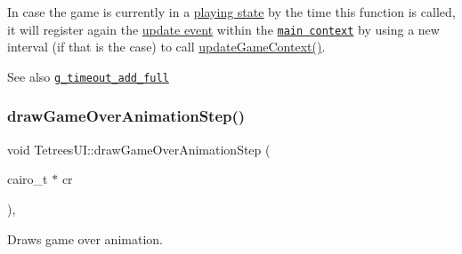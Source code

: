 In case the game is currently in a \hyperlink{TetreesDefs_8hpp_aebae08b2e3a36f1452b33acaf1eaab40ab8ee64fcce8c3b17312b20c78fc9695a}{playing state} by the time this function is called, it will register again the \hyperlink{TetreesDefs_8hpp_aaf9e35ddd627efe32323b1ba02ee514e}{update event} within the \href{https://developer.gnome.org/programming-guidelines/stable/main-contexts.html.en}{\tt main context} by using a new interval (if that is the case) to call \hyperlink{classTetreesUI_a0fe8ccb5c1c594792591036f4f02175f}{update\+Game\+Context()}. \begin{DoxySeeAlso}{See also}
\href{https://developer.gnome.org/glib/stable/glib-The-Main-Event-Loop.html#g-timeout-add-full}{\tt g\+\_\+timeout\+\_\+add\+\_\+full} 
\end{DoxySeeAlso}
\mbox{\label{classTetreesUI_a4d16e60b9a27bfbc2aac1deba09cc74c}} 
\subsubsection{\texorpdfstring{draw\+Game\+Over\+Animation\+Step()}{drawGameOverAnimationStep()}}
{\footnotesize\ttfamily void Tetrees\+U\+I\+::draw\+Game\+Over\+Animation\+Step (\begin{DoxyParamCaption}\item[{cairo\+\_\+t $\ast$}]{cr }\end{DoxyParamCaption})\hspace{0.3cm}{\ttfamily [static]}, {\ttfamily [private]}}



Draws game over animation. 

